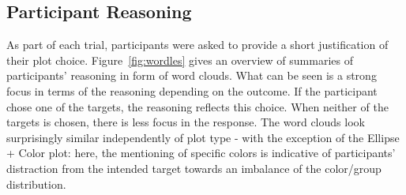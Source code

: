 \documentclass[11pt]{isuthesis}\usepackage[]{graphicx}\usepackage[]{color}
\begin{document}
\subsection{Participant Reasoning}\label{sec:sentiment}
As part of each trial, participants were asked to provide a short justification of their plot choice. Figure~\ref{fig:wordles} gives an overview of summaries of participants' reasoning in form of word clouds. What can be seen is a strong focus in terms of the reasoning depending on the outcome. If the participant chose one of the targets, the reasoning reflects this choice. When neither of the targets is chosen, there is less focus in the response. The word clouds look surprisingly similar independently of plot type - with the exception of the Ellipse + Color plot: here, the mentioning of specific colors is indicative of participants' distraction from the intended target towards an imbalance of the color/group distribution. 
\end{document}
